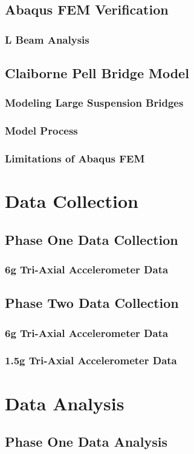 \documentclass[twoside,11pt]{report}
\begin{document}
	\section{Abaqus FEM Verification}
		\subsection{L Beam Analysis}
	\section{Claiborne Pell Bridge Model}
		\subsection{Modeling Large Suspension Bridges}
		\subsection{Model Process}
		\subsection{Limitations of Abaqus FEM}
\chapter{Data Collection}
	\section{Phase One Data Collection}
		\subsection{6g Tri-Axial Accelerometer Data}
	\section{Phase Two Data Collection}
		\subsection{6g Tri-Axial Accelerometer Data}
		\subsection{1.5g Tri-Axial Accelerometer Data}
\chapter{Data Analysis}
	\section{Phase One Data Analysis}
\end{document}
